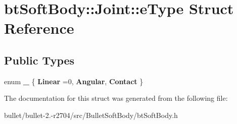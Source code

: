 \hypertarget{structbt_soft_body_1_1_joint_1_1e_type}{\section{bt\+Soft\+Body\+:\+:Joint\+:\+:e\+Type Struct Reference}
\label{structbt_soft_body_1_1_joint_1_1e_type}
}
\subsection*{Public Types}
\begin{DoxyCompactItemize}
\item 
\hypertarget{structbt_soft_body_1_1_joint_1_1e_type_adad1e35fb02127d7138d3b28b87eab20}{enum {\bfseries \+\_\+} \{ {\bfseries Linear} =0, 
{\bfseries Angular}, 
{\bfseries Contact}
 \}}\label{structbt_soft_body_1_1_joint_1_1e_type_adad1e35fb02127d7138d3b28b87eab20}

\end{DoxyCompactItemize}


The documentation for this struct was generated from the following file\+:\begin{DoxyCompactItemize}
\item 
bullet/bullet-\/2.-\/r2704/src/\+Bullet\+Soft\+Body/bt\+Soft\+Body.\+h\end{DoxyCompactItemize}
